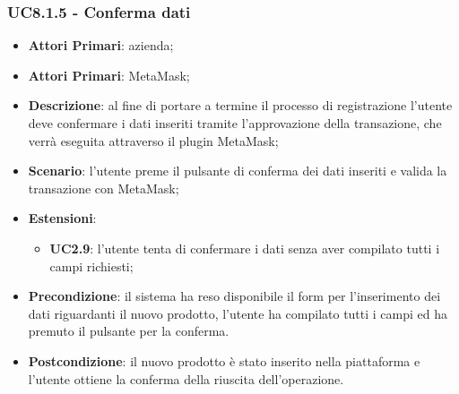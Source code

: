 \subsubsection{UC8.1.5 - Conferma dati}
\begin{itemize}
	\item \textbf{Attori Primari}: azienda;
	\item \textbf{Attori Primari}: MetaMask\glo;
	\item \textbf{Descrizione}: al fine di portare a termine il processo di registrazione l'utente deve confermare i dati inseriti tramite l'approvazione della transazione, che verrà eseguita attraverso il plugin MetaMask\glo;
	\item \textbf{Scenario}: l'utente preme il pulsante di conferma dei dati inseriti e valida la transazione con MetaMask\glo;
	\item \textbf{Estensioni}:
	\begin{itemize}
		\item \textbf{UC2.9}: l'utente tenta di confermare i dati senza aver compilato tutti i campi richiesti;
	\end{itemize}
	\item \textbf{Precondizione}: il sistema ha reso disponibile il form per l'inserimento dei dati riguardanti il nuovo prodotto, l'utente ha compilato tutti i campi ed ha premuto il pulsante per la conferma.
	\item \textbf{Postcondizione}: il nuovo prodotto è stato inserito nella piattaforma e l'utente ottiene la conferma della riuscita dell'operazione.
\end{itemize}

